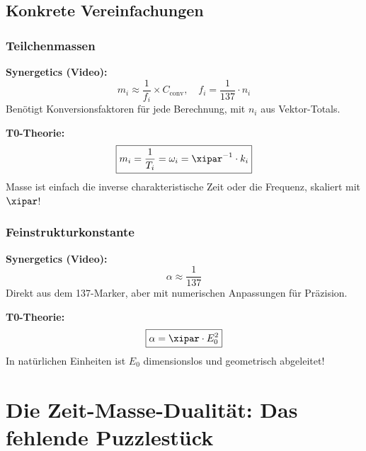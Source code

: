 	\subsection{Konkrete Vereinfachungen}
	
	\subsubsection{Teilchenmassen}
	
	\textbf{Synergetics (Video):}
	\begin{equation}
		m_i \approx \frac{1}{f_i} \times C_{\text{conv}}, \quad f_i = \frac{1}{137} \cdot n_i
	\end{equation}
	Benötigt Konversionsfaktoren für jede Berechnung, mit $n_i$ aus Vektor-Totals.
	
	\textbf{T0-Theorie:}
	\begin{equation}
		\boxed{m_i = \frac{1}{T_i} = \omega_i = \xipar^{-1} \cdot k_i}
	\end{equation}
	Masse ist einfach die inverse charakteristische Zeit oder die Frequenz, skaliert mit $\xipar$!
	
	\subsubsection{Feinstrukturkonstante}
	
	\textbf{Synergetics (Video):}
	\begin{equation}
		\alpha \approx \frac{1}{137}
	\end{equation}
	Direkt aus dem 137-Marker, aber mit numerischen Anpassungen für Präzision.
	
	\textbf{T0-Theorie:}
	\begin{equation}
		\boxed{\alpha = \xipar \cdot E_0^2}
	\end{equation}
	In natürlichen Einheiten ist $E_0$ dimensionslos und geometrisch abgeleitet!
	
	\section{Die Zeit-Masse-Dualität: Das fehlende Puzzlestück}
	
